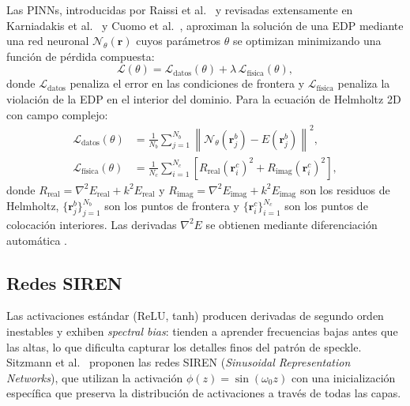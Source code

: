 Las PINNs, introducidas por Raissi et al.~\cite{Raissi2019_PINNs} y revisadas extensamente en
Karniadakis et al.~\cite{Karniadakis2021_review} y Cuomo et al.~\cite{Cuomo2022_review}, aproximan la solución de una
EDP mediante una red neuronal $\mathcal{N}_\theta(\mathbf{r})$ cuyos parámetros $\theta$
se optimizan minimizando una función de pérdida compuesta:
%
\begin{equation}
  \mathcal{L}(\theta) = \mathcal{L}_{\mathrm{datos}}(\theta)
                      + \lambda\,\mathcal{L}_{\mathrm{física}}(\theta),
  \label{eq:loss_total}
\end{equation}
%
donde $\mathcal{L}_{\mathrm{datos}}$ penaliza el error en las condiciones de frontera y
$\mathcal{L}_{\mathrm{física}}$ penaliza la violación de la EDP en el interior del dominio.
Para la ecuación de Helmholtz 2D con campo complejo:
%
\begin{align}
  \mathcal{L}_{\mathrm{datos}}(\theta) &=
    \frac{1}{N_b}\sum_{j=1}^{N_b}
    \left\|\mathcal{N}_\theta(\mathbf{r}_j^b) - E(\mathbf{r}_j^b)\right\|^2,
  \label{eq:loss_datos} \\
  \mathcal{L}_{\mathrm{física}}(\theta) &=
    \frac{1}{N_c}\sum_{i=1}^{N_c}
    \left[R_{\mathrm{real}}(\mathbf{r}_i^c)^2 + R_{\mathrm{imag}}(\mathbf{r}_i^c)^2\right],
  \label{eq:loss_fisica}
\end{align}
%
donde $R_{\mathrm{real}} = \nabla^2 E_{\mathrm{real}} + k^2 E_{\mathrm{real}}$ y
$R_{\mathrm{imag}} = \nabla^2 E_{\mathrm{imag}} + k^2 E_{\mathrm{imag}}$ son los
residuos de Helmholtz, $\{\mathbf{r}_j^b\}_{j=1}^{N_b}$ son los puntos de frontera
y $\{\mathbf{r}_i^c\}_{i=1}^{N_c}$ son los puntos de colocación interiores.
Las derivadas $\nabla^2 E$ se obtienen mediante diferenciación automática \cite{Baydin2018_autodiff}.

\subsection{Redes SIREN}
\label{subsec:siren}

Las activaciones estándar (ReLU, tanh) producen derivadas de segundo orden inestables y
exhiben \textit{spectral bias}: tienden a aprender frecuencias bajas antes que las altas,
lo que dificulta capturar los detalles finos del patrón de speckle.
Sitzmann et al.~\cite{Sitzmann2020_SIREN} proponen las redes SIREN (\textit{Sinusoidal Representation
Networks}), que utilizan la activación $\phi(z) = \sin(\omega_0 z)$ con una inicialización
específica que preserva la distribución de activaciones a través de todas las capas.

